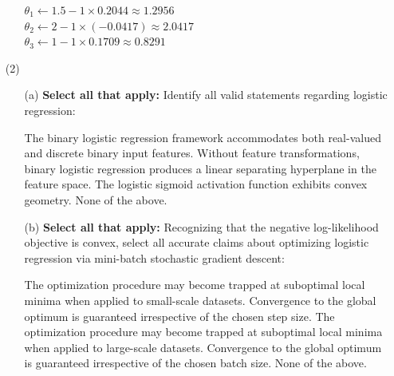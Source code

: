 \documentclass[11pt,addpoints,answers]{exam}
\newcommand{\sall}{\textbf{Select all that apply: }}
\begin{document}
\begin{enumerate}
\begin{enumerate}[label=\alph*), itemsep=10pt]
			\begin{your_solution}[title=Work, height=6cm]
				$\theta_1 \leftarrow 1.5 - 1 \times 0.2044 \approx 1.2956$\\
				$\theta_2 \leftarrow 2 - 1 \times (-0.0417) \approx 2.0417$\\
				$\theta_3 \leftarrow 1 - 1 \times 0.1709 \approx 0.8291$\\
			\end{your_solution}
			
			
		\end{enumerate}
		
		\item[(2)] 
		
		\begin{enumerate}[label=\alph*), itemsep=10pt]
			\item[(a)] \sall Identify all valid statements regarding logistic regression:
			
			{%
				\checkboxchar{$\Box$} \checkedchar{$\blacksquare$}
				\begin{checkboxes}
					\checkboxchar{$\Box$} \checkedchar{$\blacksquare$}
					\CorrectChoice The binary logistic regression framework accommodates both real-valued and discrete binary input features.
					\CorrectChoice Without feature transformations, binary logistic regression produces a linear separating hyperplane in the feature space.
					\choice The logistic sigmoid activation function exhibits convex geometry.
					\choice None of the above.
				\end{checkboxes}
			}
			
			
			
			
			\item[(b)] \sall Recognizing that the negative log-likelihood objective is convex, select all accurate claims about optimizing logistic regression via mini-batch stochastic gradient descent:
			
			{%
				\checkboxchar{$\Box$} \checkedchar{$\blacksquare$}
				\begin{checkboxes}
					\checkboxchar{$\Box$} \checkedchar{$\blacksquare$}
					\choice The optimization procedure may become trapped at suboptimal local minima when applied to small-scale datasets.
					\choice Convergence to the global optimum is guaranteed irrespective of the chosen step size.
					\choice The optimization procedure may become trapped at suboptimal local minima when applied to large-scale datasets.
					\choice Convergence to the global optimum is guaranteed irrespective of the chosen batch size.
					\CorrectChoice None of the above.
				\end{checkboxes}
			}
			

\end{enumerate}
\end{enumerate}
\end{document}
